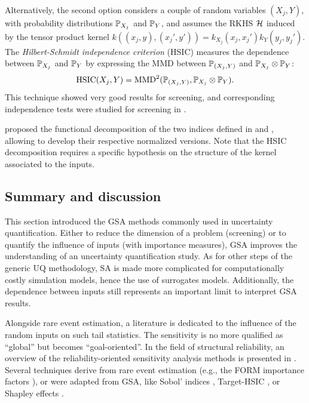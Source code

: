 Alternatively, the second option considers a couple of random variables $(X_j, Y)$, with probability distributions $\P_{X_j}$ and $\P_Y$, and assumes the RKHS $\iH$  
induced by the tensor product kernel $k((x_j, y), (x_j', y')) = k_{X_j}(x_j, x_j') k_{Y}(y_j, y_j')$. 
The \textit{Hilbert-Schmidt independence criterion} (HSIC) measures the dependence between $\P_{X_j}$ and $\P_Y$ by expressing the MMD between $\P_{(X_j, Y)}$ and $\P_{X_j} \otimes \P_{Y}$: 
\begin{equation}
    \mathrm{HSIC}(X_j, Y) = \MMD^2(\P_{(X_j, Y)}, \P_{X_j} \otimes \P_{Y}).
    \label{eq:hsic}
\end{equation}
This technique showed very good results for screening, and corresponding independence tests were studied for screening in \citet{delozzo_2016_hsic_test}. 

\citet{daveiga_2021_kernel_ANOVA} proposed the functional decomposition of the two indices defined in  and , allowing to develop their respective normalized versions. 
Note that the HSIC decomposition requires a specific hypothesis on the structure of the kernel associated to the inputs. 



\subsection{Summary and discussion}

This section introduced the GSA methods commonly used in uncertainty quantification. 
Either to reduce the dimension of a problem (screening) or to quantify the influence of inputs (with importance measures), GSA improves the understanding of an uncertainty quantification study.   
As for other steps of the generic UQ methodology, SA is made more complicated for computationally costly simulation models, hence the use of surrogates models.  
Additionally, the dependence between inputs still represents an important limit to interpret GSA results. 

Alongside rare event estimation, a literature is dedicated to the influence of the random inputs on such tail statistics. 
The sensitivity is no more qualified as ``global'' but becomes ``goal-oriented''. 
In the field of structural reliability, an overview of the reliability-oriented sensitivity analysis methods is presented in \citet{chabridon_2018_thesis}. 
Several techniques derive from rare event estimation (e.g., the FORM importance factors \citet{papaioannou_2021_rosa_form}), or were adapted from GSA, like Sobol' indices \citep{ehre_2020_rosa}, Target-HSIC \citep{marrel_chabridon_2021}, or Shapley effects \citep{demange_2023_ijuq}.  

